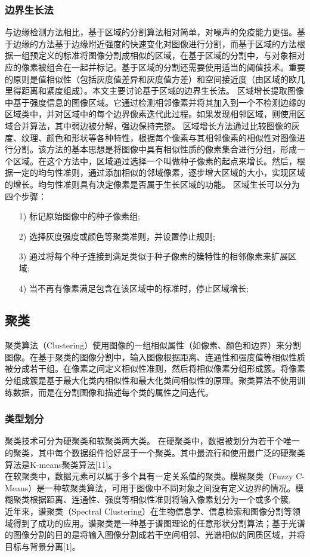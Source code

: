 \documentclass[conference]{IEEEtran}
\begin{document}
\subsubsection{边界生长法}
	与边缘检测方法相比，基于区域的分割算法相对简单，对噪声的免疫能力更强。基于边缘的方法基于边缘附近强度的快速变化对图像进行分割，而基于区域的方法根据一组预定义的标准将图像分割成相似的区域，在基于区域的分割中，与对象相对应的像素被组合在一起并标记。基于区域的分割还需要使用适当的阈值技术。重要的原则是值相似性（包括灰度值差异和灰度值方差）和空间接近度（由区域的欧几里得距离和紧度组成）。本文主要讨论基于区域的边界生长法。
	区域增长提取图像中基于强度信息的图像区域。它通过检测相邻像素并将其加入到一个不检测边缘的区域类中，并对区域中的每个边界像素迭代此过程。如果发现相邻区域，则使用区域合并算法，其中弱边被分解，强边保持完整。
    区域增长方法通过比较图像的灰度、纹理、颜色和形状等各种特性，根据每个像素与其相邻像素的相似性对图像进行分割。该方法的基本思想是将图像中具有相似性质的像素集合进行分组，形成一个区域。在这个方法中，区域通过选择一个叫做种子像素的起点来增长。然后，根据一定的均匀性准则，通过添加相似的邻域像素，逐步增大区域的大小，实现区域的增长。均匀性准则具有决定像素是否属于生长区域的功能。
	区域生长可以分为四个步骤：
\begin{itemize}
\item[1)]标记原始图像中的种子像素组;
\item[2)]选择灰度强度或颜色等聚类准则，并设置停止规则;
\item[3)]通过将每个种子连接到满足类似于种子像素的簇特性的相邻像素来扩展区域;
\item[4)]当不再有像素满足包含在该区域中的标准时，停止区域增长;
\end{itemize}

\subsection{聚类}
聚类算法（Clustering）使用图像的一组相似属性（如像素、颜色和边界）来分割图像。在基于聚类的图像分割中，输入图像根据距离、连通性和强度值等相似性质被分成若干组。在像素之间定义相似性准则，然后将相似像素分组形成簇。将像素分组成簇是基于最大化类内相似性和最大化类间相似性的原理。聚类算法不使用训练数据，而是在分割图像和描述每个类的属性之间迭代。
\subsubsection{类型划分}
聚类技术可分为硬聚类和软聚类两大类。
在硬聚类中，数据被划分为若干个唯一的聚类，其中每个数据组件恰好属于一个聚类。其中最流行和使用最广泛的硬聚类算法是K-means聚类算法[11]。\\在软聚类中，数据元素可以属于多个具有一定关系值的聚类。模糊聚类（Fuzzy C-Means）是一种软聚类算法，可用于图像中不同对象之间没有定义边界的情况。模糊聚类根据距离、连通性、强度等相似性准则将输入像素划分为一个或多个簇.\\
近年来，谱聚类（Spectral Clustering）在生物信息学、信息检索和图像分割等领域得到了成功的应用。谱聚类是一种基于谱图理论的任意形状分割算法；基于光谱的图像分割的目的是将输入图像分割成若干空间相邻、光谱相似的同质区域，并将目标与背景分离[1]。
\end{document}
